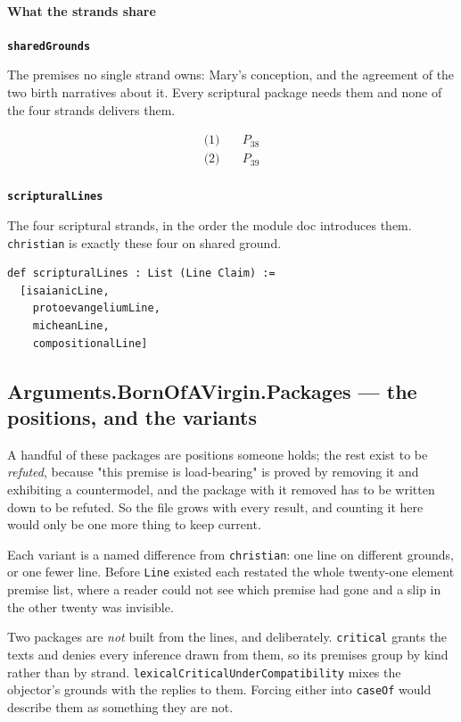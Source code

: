 \documentclass[11pt]{article}
\begin{document}
\paragraph*{What the strands share}
\leavevmode\par
\par\medskip\noindent\textbf{\texttt{shared\allowbreak{}Grounds}}\par\nobreak\noindent
The premises no single strand owns: Mary's conception, and the agreement of the two birth narratives about it. Every scriptural package needs them and none of the four strands delivers them.

\begin{align*}
  \text{(1)} \quad & P_{38} \\
  \text{(2)} \quad & P_{39} \\
\end{align*}
\par\medskip\noindent\textbf{\texttt{scriptural\allowbreak{}Lines}}\par\nobreak\noindent
The four scriptural strands, in the order the module doc introduces them. \texttt{christian} is exactly these four on shared ground.

{\small\begin{verbatim}
def scripturalLines : List (Line Claim) :=
  [isaianicLine,
    protoevangeliumLine,
    micheanLine,
    compositionalLine]
\end{verbatim}}
\subsection*{Arguments.BornOfAVirgin.Packages — the positions, and the variants}
A handful of these packages are positions someone holds; the rest exist to be \emph{refuted}, because "this premise is load-bearing" is proved by removing it and exhibiting a countermodel, and the package with it removed has to be written down to be refuted. So the file grows with every result, and counting it here would only be one more thing to keep current.

Each variant is a named difference from \texttt{christian}: one line on different grounds, or one fewer line. Before \texttt{Line} existed each restated the whole twenty-one element premise list, where a reader could not see which premise had gone and a slip in the other twenty was invisible.

Two packages are \emph{not} built from the lines, and deliberately. \texttt{critical} grants the texts and denies every inference drawn from them, so its premises group by kind rather than by strand. \texttt{lexical\allowbreak{}Critical\allowbreak{}Under\allowbreak{}Compatibility} mixes the objector's grounds with the replies to them. Forcing either into \texttt{case\allowbreak{}Of} would describe them as something they are not.
\end{document}
